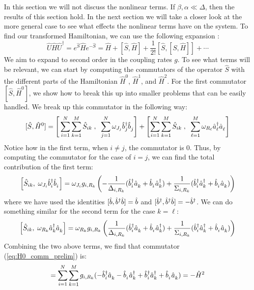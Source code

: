 In this section we will not discuss the nonlinear terms. If $\beta,\alpha \ll \Delta$, then the results of this section hold. In the next section we will take a closer look at the more general case to see what effects the nonlinear terms have on the system. To find our transformed Hamiltonian, we can use the following expansion \cite{winkler2003}:
\begin{equation}\label{eq:BCH}
    \hat{U} \hat{H} \hat{U}^\dag = e^{\hat{S}} \hat{H} e^{-\hat{S}} = \hat{H} + [\hat{S},\hat{H}] + \frac{1}{2!}[\hat{S},[\hat{S},\hat{H}]] + \cdots
\end{equation}
We aim to expand to second order in the coupling rates $g$. To see what terms will be relevant, we can start by computing the commutators of the operator $\hat{S}$ with the different parts of the Hamiltonian $\hat{H}^0$, $\hat{H}^1$, and $\hat{H}^2$. For the first commutator $[\hat{S}, \hat{H}^0]$, we show how to break this up into smaller problems that can be easily handled. We break up this commutator in the following way:
\begin{equation}\label{eq:H0_comm_prelim}
    [\hat{S}, \hat{H}^0] = \Bigg[ \sum_{i=1}^N \sum_{k=1}^M \hat{S}_{ik}\;,\;\; \sum_{j=1}^N \omega_{J_j}\opbd_j\opb_j\Bigg] + \left[ \sum_{i=1}^N \sum_{k=1}^M\hat{S}_{ik}\;,\;\;\sum_{\ell=1}^M \omega_{R_\ell}\opad_\ell\opa_\ell \right]
\end{equation}
Notice how in the first term, when $i \neq j$, the commutator is 0. Thus, by computing the commutator for the case of $i=j$, we can find the total contribution of the first term:
\begin{equation}\label{eq:comm_H0_Q}
    \left[\hat{S}_{ik},\; \omega_{J_i} \opbd_i\opb_i\right] = \omega_{J_i} g_{i,R_k} \left( -\frac{1}{\Delta_{i,R_k}}(\opbd_i\opa_k + \opb_i\opad_k) + \frac{1}{\Sigma_{i,R_k}}(\opbd_i\opad_k + \opb_i\opa_k) \right)
\end{equation}
where we have used the identities $[\hat{b}, \hat{b}^{\dagger}\hat{b}] = \hat{b}$ and $[\hat{b}^{\dagger}, \hat{b}^{\dagger}\hat{b}] = -\hat{b}^{\dagger}$. We can do something similar for the second term for the case $k=\ell$:
\begin{equation}\label{eq:comm_H0_R}
    \left[\hat{S}_{ik},\; \omega_{R_k}\opad_k\opa_k \right] = \omega_{R_k} g_{i,R_k} \left( \frac{1}{\Delta_{i,R_k}} (\opbd_i\opa_k + \opb_i\opad_k) + \frac{1}{\Sigma_{i,R_k}} (\opbd_i\opad_k + \opb_i\opa_k) \right)
\end{equation}
Combining the two above terms, we find that commutator (\ref{eq:H0_comm_prelim}) is:
\begin{equation}
    [\hat{S}, \hat{H}^0] = \sum_{i=1}^N \sum_{k=1}^M g_{i,R_k}(-\opbd_i\opa_k - \opb_i\opad_k + \opbd_i\opad_k + \opb_i\opa_k) = -\hat{H}^2
\end{equation}

